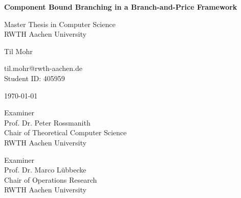 \documentclass[
	12pt, %
	a4paper, %
	twoside, %
]{report}
\begin{document}
\begin{titlepage}
	\centering
	{\Huge\bfseries Component Bound Branching in a Branch-and-Price Framework\par}
	\vspace{0.85cm}
	{\LARGE Master Thesis in Computer Science\\RWTH Aachen University\par}
	\vspace{2cm}
	{\LARGE Til Mohr\par}
	\vspace{0.5cm}
	{\large til.mohr@rwth-aachen.de\\Student ID: 405959\par}
	\vspace{2cm}
	{\large \today\par}
	\vspace{2cm}
	\begin{minipage}{0.48\textwidth}
		\centering
		 Examiner\\
		Prof. Dr. Peter Rossmanith\\
		Chair of Theoretical Computer Science\\
		RWTH Aachen University
	\end{minipage}
	\begin{minipage}{0.48\textwidth}
		\centering
		 Examiner\\
		Prof. Dr. Marco Lübbecke\\
		Chair of Operations Research\\
		RWTH Aachen University
	\end{minipage}
\end{titlepage}


\end{document}
